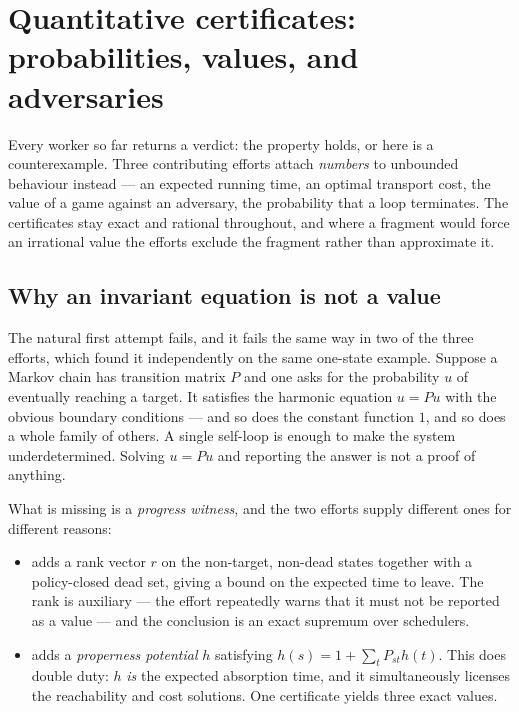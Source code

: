 \section{Quantitative certificates: probabilities, values, and adversaries}
\label{sec:quantitative}

Every worker so far returns a verdict: the property holds, or here is a
counterexample. Three contributing efforts attach \emph{numbers} to unbounded
behaviour instead --- an expected running time, an optimal transport cost, the
value of a game against an adversary, the probability that a loop terminates.
The certificates stay exact and rational throughout, and where a fragment would
force an irrational value the efforts exclude the fragment rather than
approximate it.

\subsection{Why an invariant equation is not a value}

The natural first attempt fails, and it fails the same way in two of the three
efforts, which found it independently on the same one-state example. Suppose a
Markov chain has transition matrix $P$ and one asks for the probability $u$ of
eventually reaching a target. It satisfies the harmonic equation $u=Pu$ with
the obvious boundary conditions --- and so does the constant function $1$, and
so does a whole family of others. A single self-loop is enough to make the
system underdetermined. Solving $u=Pu$ and reporting the answer is not a proof
of anything.

What is missing is a \emph{progress witness}, and the two efforts supply
different ones for different reasons:

\begin{itemize}[leftmargin=1.4em]
\item {} adds a rank vector $r$ on the non-target, non-dead states
together with a policy-closed dead set, giving a bound on the expected time to
leave. The rank is auxiliary --- the effort repeatedly warns that it must not
be reported as a value --- and the conclusion is an exact supremum over
schedulers.
\item {} adds a \emph{properness potential} $h$ satisfying
$h(s)=1+\sum_t P_{st}h(t)$. This does double duty: $h$ \emph{is} the expected
absorption time, and it simultaneously licenses the reachability and cost
solutions. One certificate yields three exact values.
\end{itemize}

